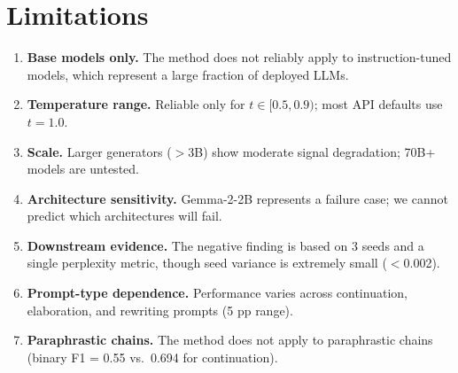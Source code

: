 \documentclass[11pt,a4paper]{article}
\begin{document}
\section*{Limitations}

\begin{enumerate}
    \item \textbf{Base models only.} The method does not reliably apply to instruction-tuned models, which represent a large fraction of deployed LLMs.
    \item \textbf{Temperature range.} Reliable only for $t \in [0.5, 0.9)$; most API defaults use $t = 1.0$.
    \item \textbf{Scale.} Larger generators ($>$3B) show moderate signal degradation; 70B+ models are untested.
    \item \textbf{Architecture sensitivity.} Gemma-2-2B represents a failure case; we cannot predict which architectures will fail.
    \item \textbf{Downstream evidence.} The negative finding is based on 3 seeds and a single perplexity metric, though seed variance is extremely small ($<$0.002).
    \item \textbf{Prompt-type dependence.} Performance varies across continuation, elaboration, and rewriting prompts (5 pp range).
    \item \textbf{Paraphrastic chains.} The method does not apply to paraphrastic chains (binary F1 = 0.55 vs.\ 0.694 for continuation).
\end{enumerate}
\end{document}
